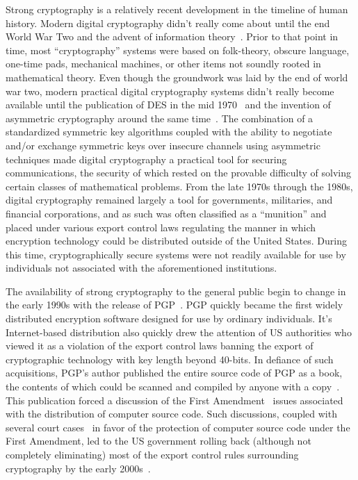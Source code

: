 Strong cryptography is a relatively recent development in the timeline
of human history. Modern digital cryptography didn't really come about
until the end World War Two and the advent of information
theory~\cite{shannon1945}. Prior to that point in time, most
``cryptography'' systems were based on folk-theory, obscure language,
one-time pads, mechanical machines, or other items not soundly rooted
in mathematical theory. Even though the groundwork was laid by the end
of world war two, modern practical digital cryptography systems didn't
really become available until the publication of DES in the mid
1970~\cite{fips46} and the invention of asymmetric cryptography around
the same time~\cite{diffie1976}. The combination of a standardized
symmetric key algorithms coupled with the ability to negotiate and/or
exchange symmetric keys over insecure channels using asymmetric
techniques made digital cryptography a practical tool for securing
communications, the security of which rested on the provable
difficulty of solving certain classes of mathematical problems. From
the late 1970s through the 1980s, digital cryptography remained
largely a tool for governments, militaries, and financial
corporations, and as such was often classified as a ``munition'' and
placed under various export control laws regulating the manner in
which encryption technology could be distributed outside of the United
States. During this time, cryptographically secure systems were not
readily available for use by individuals not associated with the
aforementioned institutions.

The availability of strong cryptography to the general public begin to
change in the early 1990s with the release of
PGP~\cite{zimmermann-pgp10}. PGP quickly became the first widely
distributed encryption software designed for use by ordinary
individuals. It's Internet-based distribution also quickly drew the
attention of US authorities who viewed it as a violation of the export
control laws banning the export of cryptographic technology with key
length beyond 40-bits. In defiance of such acquisitions, PGP's author
published the entire source code of PGP as a book, the contents of
which could be scanned and compiled by anyone with a
copy~\cite{zimmermann-pgpsource}. This publication forced a discussion
of the First Amendment~\cite{us-constitution-amend1} issues associated
with the distribution of computer source code. Such discussions,
coupled with several court cases~\cite{ninthcir-bernstein,
  sixthcir-junger} in favor of the protection of computer source code
under the First Amendment, led to the US government rolling back
(although not completely eliminating) most of the export control rules
surrounding cryptography by the early 2000s~\cite{kehl2015}.

